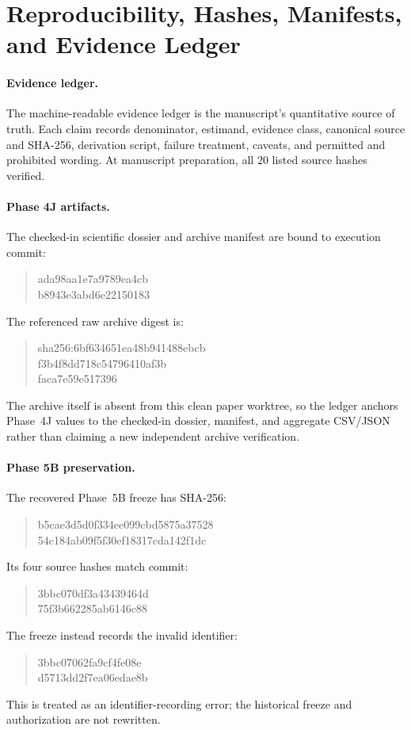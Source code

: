 \section{Reproducibility, Hashes, Manifests, and Evidence Ledger}
\label{supp:reproducibility}

\paragraph{Evidence ledger.}
The machine-readable evidence ledger is the manuscript's quantitative source
of truth.  Each claim records denominator, estimand, evidence class, canonical
source and SHA-256, derivation script, failure treatment, caveats, and
permitted and prohibited wording.  At manuscript preparation, all 20 listed
source hashes verified.

\paragraph{Phase 4J artifacts.}
The checked-in scientific dossier and archive manifest are bound to execution
commit:
\begin{quote}
\ttfamily
ada98aa1e7a9789ea4cb\\
b8943e3abd6e22150183
\end{quote}
The referenced raw archive digest is:
\begin{quote}
\ttfamily
sha256:6bf634651ea48b941488ebcb\\
f3b4f8dd718c54796410af3b\\
faca7e59e517396
\end{quote}
The archive itself is absent from this clean paper worktree, so the ledger
anchors Phase~4J values to the checked-in dossier, manifest, and aggregate
CSV/JSON rather than claiming a new independent archive verification.

\paragraph{Phase 5B preservation.}
The recovered Phase~5B freeze has SHA-256:
\begin{quote}
\ttfamily
b5cae3d5d0f334ee099cbd5875a37528\\
54c184ab09f5f30ef18317cda142f1dc
\end{quote}
Its four source hashes match commit:
\begin{quote}
\ttfamily
3bbc070df3a43439464d\\
75f3b662285ab6146c88
\end{quote}
The freeze instead records the invalid identifier:
\begin{quote}
\ttfamily
3bbc07062fa9cf4fe08e\\
d5713dd2f7ea06edae8b
\end{quote}
This is treated as an identifier-recording error; the historical freeze and
authorization are not rewritten.

